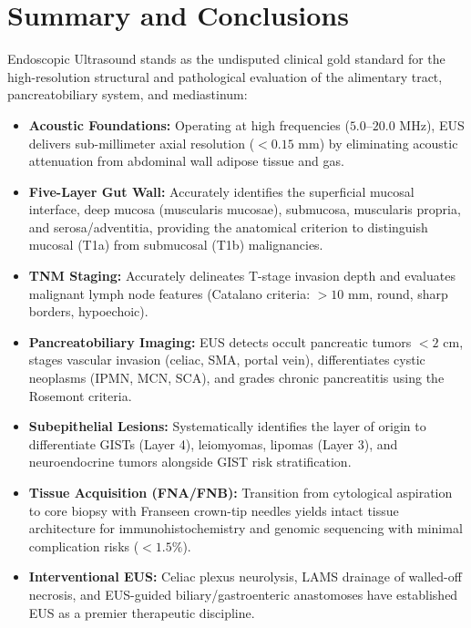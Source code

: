 \documentclass[11pt,a4paper]{article}
\begin{document}
\section{Summary and Conclusions}
Endoscopic Ultrasound stands as the undisputed clinical gold standard for the high-resolution structural and pathological evaluation of the alimentary tract, pancreatobiliary system, and mediastinum:

\begin{itemize}[leftmargin=2em]
    \item \textbf{Acoustic Foundations:} Operating at high frequencies ($5.0\text{--}20.0\text{ MHz}$), EUS delivers sub-millimeter axial resolution ($< 0.15\text{ mm}$) by eliminating acoustic attenuation from abdominal wall adipose tissue and gas.
    \item \textbf{Five-Layer Gut Wall:} Accurately identifies the superficial mucosal interface, deep mucosa (muscularis mucosae), submucosa, muscularis propria, and serosa/adventitia, providing the anatomical criterion to distinguish mucosal (T1a) from submucosal (T1b) malignancies.
    \item \textbf{TNM Staging:} Accurately delineates T-stage invasion depth and evaluates malignant lymph node features (Catalano criteria: $> 10\text{ mm}$, round, sharp borders, hypoechoic).
    \item \textbf{Pancreatobiliary Imaging:} EUS detects occult pancreatic tumors $< 2\text{ cm}$, stages vascular invasion (celiac, SMA, portal vein), differentiates cystic neoplasms (IPMN, MCN, SCA), and grades chronic pancreatitis using the Rosemont criteria.
    \item \textbf{Subepithelial Lesions:} Systematically identifies the layer of origin to differentiate GISTs (Layer 4), leiomyomas, lipomas (Layer 3), and neuroendocrine tumors alongside GIST risk stratification.
    \item \textbf{Tissue Acquisition (FNA/FNB):} Transition from cytological aspiration to core biopsy with Franseen crown-tip needles yields intact tissue architecture for immunohistochemistry and genomic sequencing with minimal complication risks ($< 1.5\%$).
    \item \textbf{Interventional EUS:} Celiac plexus neurolysis, LAMS drainage of walled-off necrosis, and EUS-guided biliary/gastroenteric anastomoses have established EUS as a premier therapeutic discipline.
\end{itemize}
\end{document}
